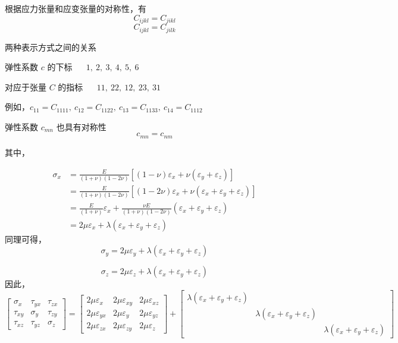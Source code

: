 \documentclass[12pt,a4paper]{article}
\begin{document}
根据应力张量和应变张量的对称性，有
$$
C_{ijkl}=C_{jikl}
$$
$$
C_{ijkl}=C_{jilk}
$$

两种表示方式之间的关系

弹性系数 $c$ 的下标 ~~ $1, ~ 2, ~ 3, ~ 4, ~ 5, ~ 6$

对应于张量 $C$ 的指标 ~~ $11, ~ 22, ~ 12, ~ 23, ~ 31$

例如，$c_{11}=C_{1111}, ~ c_{12}=C_{1122}, ~ c_{13}=C_{1133}, ~ c_{14}=C_{1112}$

弹性系数 $c_{mn}$ 也具有对称性
$$
c_{mn}=c_{nm}
$$

其中，

\begin{align*}
\sigma_x & =\frac{E}{(1+\nu)(1-2\nu)}[(1-\nu)\varepsilon_x+\nu(\varepsilon_y+\varepsilon_z)]\\
& =\frac{E}{(1+\nu)(1-2\nu)}[(1-2\nu)\varepsilon_x+\nu(\varepsilon_x+\varepsilon_y+\varepsilon_z)] \\
& =\frac{E}{(1+\nu)}\varepsilon_x+\frac{\nu E}{(1+\nu)(1-2\nu)}(\varepsilon_x+\varepsilon_y+\varepsilon_z) \\
& =2\mu\varepsilon_x+\lambda(\varepsilon_x+\varepsilon_y+\varepsilon_z)
\end{align*}
同理可得，
$$
\sigma_y=2\mu\varepsilon_y+\lambda(\varepsilon_x+\varepsilon_y+\varepsilon_z)
$$

$$
\sigma_z=2\mu\varepsilon_z+\lambda(\varepsilon_x+\varepsilon_y+\varepsilon_z)
$$
因此，
$$
\begin{bmatrix}
\sigma _x & \tau_{yx} & \tau_{zx} \\
\tau_{xy} & \sigma _y & \tau_{zy} \\
\tau_{xz} & \tau_{yz} & \sigma _z
\end{bmatrix}=
\begin{bmatrix}
2\mu\varepsilon_x & 2\mu\varepsilon_{xy} & 2\mu\varepsilon_{xz} \\
2\mu\varepsilon_{yx} & 2\mu\varepsilon_{y} & 2\mu\varepsilon_{yz} \\
2\mu\varepsilon_{zx} & 2\mu\varepsilon_{zy} & 2\mu\varepsilon_{z}
\end{bmatrix}+\begin{bmatrix}
\lambda(\varepsilon_x+\varepsilon_y+\varepsilon_z) &  &  \\
 & \lambda(\varepsilon_x+\varepsilon_y+\varepsilon_z) &  \\
 &  & \lambda(\varepsilon_x+\varepsilon_y+\varepsilon_z)
\end{bmatrix}
$$
\end{document}
